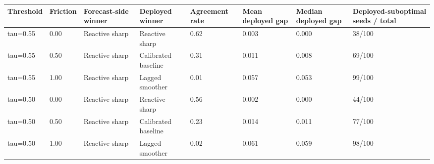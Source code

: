 \begin{tabular}{llllllll}
\toprule
Threshold & Friction & Forecast-side winner & Deployed winner & Agreement rate & Mean deployed gap & Median deployed gap & Deployed-suboptimal seeds / total \\
\midrule
tau=0.55 & 0.00 & Reactive sharp & Reactive sharp & 0.62 & 0.003 & 0.000 & 38/100 \\
tau=0.55 & 0.50 & Reactive sharp & Calibrated baseline & 0.31 & 0.011 & 0.008 & 69/100 \\
tau=0.55 & 1.00 & Reactive sharp & Lagged smoother & 0.01 & 0.057 & 0.053 & 99/100 \\
tau=0.50 & 0.00 & Reactive sharp & Reactive sharp & 0.56 & 0.002 & 0.000 & 44/100 \\
tau=0.50 & 0.50 & Reactive sharp & Calibrated baseline & 0.23 & 0.014 & 0.011 & 77/100 \\
tau=0.50 & 1.00 & Reactive sharp & Lagged smoother & 0.02 & 0.061 & 0.059 & 98/100 \\
\bottomrule
\end{tabular}
